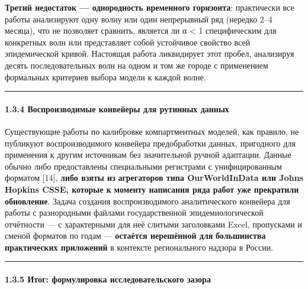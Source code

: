 \documentclass[12pt]{article}
\begin{document}
\textbf{Третий недостаток --- однородность временного горизонта}:
практически все работы анализируют одну волну или один непрерывный ряд
(нередко 2--4 месяца), что не позволяет сравнить, является ли α
\textless{} 1 специфическим для конкретных волн или представляет собой
устойчивое свойство всей эпидемической кривой. Настоящая работа
ликвидирует этот пробел, анализируя десять последовательных волн на
одном и том же городе с применением формальных критериев выбора модели к
каждой волне.

\begin{center}\rule{0.5\linewidth}{0.5pt}\end{center}

\paragraph{1.3.4 Воспроизводимые конвейеры для рутинных
данных}\label{ux432ux43eux441ux43fux440ux43eux438ux437ux432ux43eux434ux438ux43cux44bux435-ux43aux43eux43dux432ux435ux439ux435ux440ux44b-ux434ux43bux44f-ux440ux443ux442ux438ux43dux43dux44bux445-ux434ux430ux43dux43dux44bux445}

Существующие работы по калибровке компартментных моделей, как правило,
не публикуют воспроизводимого конвейера предобработки данных, пригодного
для применения к другим источникам без значительной ручной адаптации.
Данные обычно либо предоставлены специальными регистрами с
унифицированным форматом {[}14{]}, \textbf{либо взяты из}
\textbf{агрегаторов типа OurWorldInData или Johns Hopkins CSSE, которые
к} \textbf{моменту написания ряда работ уже прекратили обновление}.
Задача создания воспроизводимого аналитического конвейера для работы с
разнородными файлами государственной эпидемиологической отчётности --- с
характерными для неё слитыми заголовками Excel, пропусками и сменой
форматов по годам --- \textbf{остаётся нерешённой для}
\textbf{большинства практических приложений} в контексте регионального
надзора в России.

\begin{center}\rule{0.5\linewidth}{0.5pt}\end{center}

\paragraph{1.3.5 Итог: формулировка исследовательского
зазора}\label{ux438ux442ux43eux433-ux444ux43eux440ux43cux443ux43bux438ux440ux43eux432ux43aux430-ux438ux441ux441ux43bux435ux434ux43eux432ux430ux442ux435ux43bux44cux441ux43aux43eux433ux43e-ux437ux430ux437ux43eux440ux430}
\end{document}
